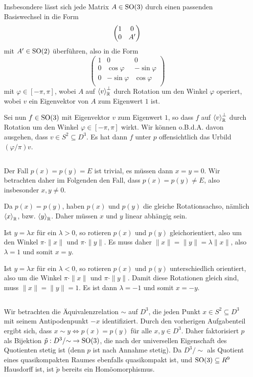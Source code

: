 \documentclass[a4paper,10pt]{article}
\begin{document}
Insbesondere lässt sich jede Matrix $A \in \operatorname{SO}(3)$ durch einen passenden Basiswechsel in die Form
\[
 \begin{pmatrix}1 & 0 \\ 0 & A'\end{pmatrix}
\]
mit $A' \in \operatorname{SO}(2)$ überführen, also in die Form
\[
 \begin{pmatrix}
  1 &             0 &             0 \\
  0 &  \cos \varphi & -\sin \varphi \\
  0 & -\sin \varphi &  \cos \varphi \\
 \end{pmatrix}
\]
mit $\varphi \in [-\pi,\pi]$, wobei $A$ auf $\left\langle v \right\rangle_{\mathbb{R}}^\perp$ durch Rotation um den Winkel $\varphi$ operiert, wobei $v$ ein Eigenvektor von $A$ zum Eigenwert $1$ ist.

Sei nun $f \in \operatorname{SO}(3)$ mit Eigenvektor $v$ zum Eigenwert $1$, so dass $f$ auf $\left\langle v \right\rangle_{\mathbb{R}}^\perp$ durch Rotation um den Winkel $\varphi \in [-\pi,\pi]$ wirkt. Wir können o.B.d.A. davon ausgehen, dass $v \in S^2 \subseteq D^3$. Es hat dann $f$ unter $p$ offensichtlich das Urbild $(\varphi/\pi)v$.


\addtocounter{subsection}{1}
\subsection{}
Der Fall $p(x) = p(y) = E$ ist trivial, es müssen dann $x = y = 0$. Wir betrachten daher im Folgenden den Fall, dass $p(x) = p(y) \neq E$, also insbesonder $x,y \neq 0$.

Da $p(x) = p(y)$, haben $p(x)$ und $p(y)$ die gleiche Rotationsachso, nämlich $\left\langle x \right\rangle_{\mathbb{R}}$, bzw. $\left\langle y \right\rangle_{\mathbb{R}}$. Daher müssen $x$ und $y$ linear abhängig sein.

Ist $y = \lambda x$ für ein $\lambda > 0$, so rotieren $p(x)$ und $p(y)$ gleichorientiert, also um den Winkel $\pi \cdot \|x\|$ und $\pi \cdot \|y\|$. Es muss daher $\|x\| = \|y\| = \lambda \|x\|$, also $\lambda = 1$ und somit $x = y$.

Ist $y = \lambda x$ für ein $\lambda < 0$, so rotieren $p(x)$ und $p(y)$ unterschiedlich orientiert, also um die Winkel $\pi \cdot \|x\|$ und $\pi \cdot \|y\|$. Damit diese Rotationen gleich sind, muss $\|x\| = \|y\| = 1$. Es ist dann $\lambda = -1$ und somit $x = -y$.


\addtocounter{subsection}{-1}
\subsection{}
Wir betrachten die Äquivalenzrelation $\sim$ auf $D^3$, die jeden Punkt $x \in S^2 \subseteq D^3$ mit seinem Antipodenpunkt $-x$ identifiziert. Durch den vorherigen Aufgabenteil ergibt sich, dass $x \sim y \Leftrightarrow p(x) = p(y)$ für alle $x,y \in D^3$. Daher faktorisiert $p$ als Bijektion $\tilde{p} : D^3/{\sim} \to \operatorname{SO}(3)$, die nach der universellen Eigenschaft des Quotienten stetig ist (denn $p$ ist nach Annahme stetig). Da $D^3/{\sim}$ als Quotient eines quasikompakten Raumes ebenfalls quasikompakt ist, und $\operatorname{SO}(3) \subseteq R^9$ Hausdorff ist, ist $\tilde{p}$ bereits ein Homöomorphismus.
\end{document}
